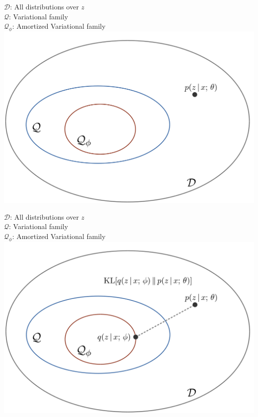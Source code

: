 \begin{frame}
$\mathcal{D}$: All distributions over $z$ \\
$\mathcal{Q}$: Variational family \\
$\mathcal{Q}_\phi$: Amortized Variational family 
\center
\includegraphics[scale=0.24]{pics/avi3.png}
\end{frame}
  
\begin{frame}
$\mathcal{D}$: All distributions over $z$ \\
$\mathcal{Q}$: Variational family \\
$\mathcal{Q}_\phi$: Amortized Variational family 
\center
\includegraphics[scale=0.24]{pics/avi4.png}
\end{frame}

